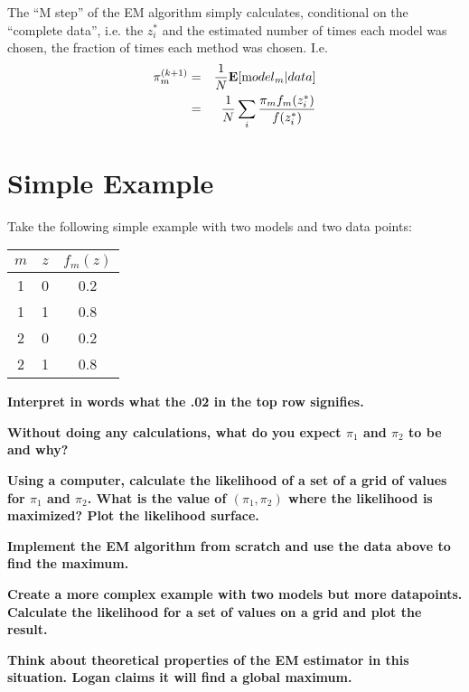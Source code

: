 \documentclass{article}
\begin{document}
The ``M step'' of the EM algorithm simply calculates, conditional on the ``complete data'', i.e. the $z^*_i$ and the estimated number of times each model was chosen, the fraction of times each method was chosen. I.e. 
\begin{eqnarray}
\pi_m^{(k+1)} & = & \frac{1}{N} {\mathbf E}[ {\mbox model}_m |data ] \\
& = & \frac{1}{N} \sum_i \frac{\pi_m f_m(z_i^*)}{f(z_i^*)} 
\end{eqnarray}

\section{Simple Example}

Take the following simple example with two models and two data points:

\begin{table}[ht]
\centering
\begin{tabular}{ccc}
$m$ & $z$ & $f_m(z)$ \\ 
  \hline
1 & 0 & 0.2  \\ 
1 & 1 & 0.8  \\ 
2 & 0 & 0.2  \\ 
2 & 1 & 0.8  
\end{tabular}
\end{table}

{\bf Interpret in words what the .02 in the top row signifies.}

{\bf Without doing any calculations, what do you expect $\pi_1$ and $\pi_2$ to be and why?}

{\bf Using a computer, calculate the likelihood of a set of a grid of values for $\pi_1$ and $\pi_2$. What is the value of $(\pi_1, \pi_2)$ where the likelihood is maximized? Plot the likelihood surface.}

{\bf Implement the EM algorithm from scratch and use the data above to find the maximum.}

{\bf Create a more complex example with two models but more datapoints. Calculate the likelihood for a set of values on a grid and plot the result.}

{\bf Think about theoretical properties of the EM estimator in this situation. Logan claims it will find a global maximum.}
% 
\end{document}
